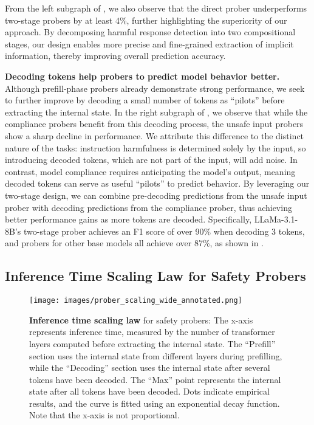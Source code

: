 From the left subgraph of , we also observe that the direct prober underperforms two-stage probers by at least 4\%, further highlighting the superiority of our approach. By decomposing harmful response detection into two compositional stages, our design enables more precise and fine-grained extraction of implicit information, thereby improving overall prediction accuracy.

\textbf{Decoding tokens help probers to predict model behavior better.} Although prefill-phase probers  already demonstrate strong performance, we seek to further improve by decoding a small number of tokens as ``pilots'' before extracting the internal state. In the right subgraph of , we observe that while the compliance probers benefit from this decoding process, the unsafe input probers show a sharp decline in performance. We attribute this difference to the distinct nature of the tasks: instruction harmfulness is determined solely by the input, so introducing decoded tokens, which are not part of the input, will add noise. In contrast, model compliance requires anticipating the model's output, meaning decoded tokens can serve as useful ``pilots'' to predict behavior. By leveraging our two-stage design, we can combine pre-decoding predictions from the unsafe input prober with decoding predictions from the compliance prober, thus achieving better performance gains as more tokens are decoded. Specifically, LLaMa-3.1-8B's two-stage prober achieves an F1 score of over 90\% when decoding 3 tokens, and probers for other base models all achieve over 87\%, as shown in .



\subsection{Inference Time Scaling Law for Safety Probers}
\label{sec:ITC_results}

\begin{figure}[htbp]
    \centering
    \texttt{[image: images/prober\_scaling\_wide\_annotated.png]}
    \caption{\textbf{Inference time scaling law} for safety probers: The x-axis represents inference time, measured by the number of transformer layers computed before extracting the internal state. The ``Prefill'' section uses the internal state from different layers during prefilling, while the ``Decoding'' section uses the internal state after several tokens have been decoded. The ``Max'' point represents the internal state after all tokens have been decoded. Dots indicate empirical results, and the curve is fitted using an exponential decay function. Note that the x-axis is not proportional.}
    \label{fig:inf_scaling}
\end{figure}

